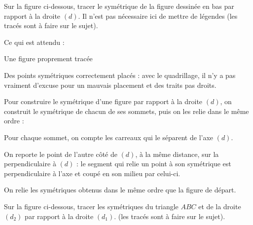 \documentclass[answers]{exam}
\begin{document}
\begin{questions}
  \question[3] Sur la figure ci-dessous, tracer le symétrique de la figure dessinée en bas par rapport à la droite $(d)$. Il n'est pas nécessaire ici de mettre de légendes (les tracés sont à faire sur le sujet).


\begin{solution}
      \begin{Indication}

Ce qui est attendu : 
\begin{compactitem}
\item Une figure proprement tracée
\item Des points symétriques correctement placés : avec le quadrillage, il n'y a pas vraiment d'excuse pour un mauvais placement et des traits pas droits.
\end{compactitem}

      \end{Indication}

      Pour construire le symétrique d'une figure par rapport à la droite $(d)$, on construit le symétrique de chacun de ses sommets, puis on les relie dans le même ordre :
      \begin{compactenum}
        \item Pour chaque sommet, on compte les carreaux qui le séparent de l'axe $(d)$.
        \item On reporte le point de l'autre côté de $(d)$, à la même distance, sur la perpendiculaire à $(d)$ : le segment qui relie un point à son symétrique est perpendiculaire à l'axe et coupé en son milieu par celui-ci.
        \item On relie les symétriques obtenus dans le même ordre que la figure de départ.
      \end{compactenum}
      \end{solution}


\pagebreak
  \question[5] Sur la figure ci-dessous, tracer les symétriques du triangle $ABC$ et de la droite $(d_2)$ par rapport à la droite $(d_1)$.  (les tracés sont à faire sur le sujet).
\end{questions}
\end{document}
